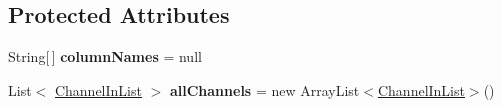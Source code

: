 \subsection*{Protected Attributes}
\begin{DoxyCompactItemize}
\item 
\hypertarget{classgov_1_1fnal_1_1ppd_1_1dd_1_1channel_1_1list_1_1table_1_1AbstractChannelTableModel_a04eb656b0de2250db759665a3edc56a6}{String\mbox{[}$\,$\mbox{]} {\bfseries column\-Names} = null}\label{classgov_1_1fnal_1_1ppd_1_1dd_1_1channel_1_1list_1_1table_1_1AbstractChannelTableModel_a04eb656b0de2250db759665a3edc56a6}

\item 
\hypertarget{classgov_1_1fnal_1_1ppd_1_1dd_1_1channel_1_1list_1_1table_1_1AbstractChannelTableModel_a5fdecb28c6ee13eefbebf4588e1878d4}{List$<$ \hyperlink{interfacegov_1_1fnal_1_1ppd_1_1dd_1_1channel_1_1ChannelInList}{Channel\-In\-List} $>$ {\bfseries all\-Channels} = new Array\-List$<$\hyperlink{interfacegov_1_1fnal_1_1ppd_1_1dd_1_1channel_1_1ChannelInList}{Channel\-In\-List}$>$()}\label{classgov_1_1fnal_1_1ppd_1_1dd_1_1channel_1_1list_1_1table_1_1AbstractChannelTableModel_a5fdecb28c6ee13eefbebf4588e1878d4}

\end{DoxyCompactItemize}


